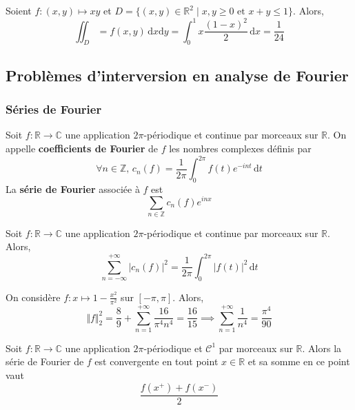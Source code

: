 
  \begin{example}
    Soient $f : (x,y) \mapsto xy$ et $D = \{ (x,y) \in \mathbb{R}^2 \mid x, y \geq 0 \text{ et } x + y \leq 1 \}$. Alors,
    \[ \iint_D = f(x,y) \, \mathrm{d}x \mathrm{d}y = \int_0^1 x \frac{(1-x)^2}{2} \, \mathrm{d}x = \frac{1}{24} \]
  \end{example}

  \subsection{Problèmes d'interversion en analyse de Fourier}

  \subsubsection{Séries de Fourier}


  \begin{definition}
    Soit $f : \mathbb{R} \rightarrow \mathbb{C}$ une application $2\pi$-périodique et continue par morceaux sur $\mathbb{R}$. On appelle \textbf{coefficients de Fourier} de $f$ les nombres complexes définis par
    \[ \forall n \in \mathbb{Z}, \, c_n(f) = \frac{1}{2\pi} \int_{0}^{2\pi} f(t) e^{-int} \, \mathrm{d}t \]
    La \textbf{série de Fourier} associée à $f$ est
    \[ \sum_{n \in \mathbb{Z}} c_n(f)e^{inx} \]
  \end{definition}

  \begin{theorem}
    Soit $f : \mathbb{R} \rightarrow \mathbb{C}$ une application $2\pi$-périodique et continue par morceaux sur $\mathbb{R}$. Alors,
    \[ \sum_{n=-\infty}^{+\infty} |c_n(f)|^2 = \frac{1}{2\pi} \int_0^{2\pi} |f(t)|^2 \, \mathrm{d}t \]
  \end{theorem}

  \begin{example}
    On considère $f : x \mapsto 1 - \frac{x^2}{\pi^2}$ sur $[-\pi, \pi]$. Alors,
    \[ \Vert f \Vert^2_2 = \frac{8}{9} + \sum_{n=1}^{+\infty} \frac{16}{\pi^4 n^4} = \frac{16}{15} \implies \sum_{n=1}^{+\infty} \frac{1}{n^4} = \frac{\pi^4}{90} \]
  \end{example}

  \begin{theorem}
    Soit $f : \mathbb{R} \rightarrow \mathbb{C}$ une application $2\pi$-périodique et $\mathcal{C}^1$ par morceaux sur $\mathbb{R}$. Alors la série de Fourier de $f$ est convergente en tout point $x \in \mathbb{R}$ et sa somme en ce point vaut
    \[ \frac{f(x^+) + f(x^-)}{2} \]
  \end{theorem}

